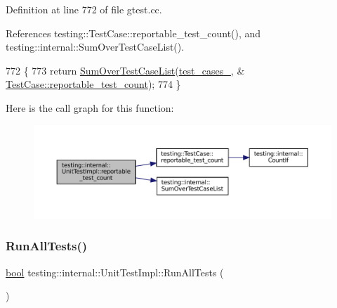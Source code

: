 Definition at line 772 of file gtest.\+cc.



References testing\+::\+Test\+Case\+::reportable\+\_\+test\+\_\+count(), and testing\+::internal\+::\+Sum\+Over\+Test\+Case\+List().


\begin{DoxyCode}
772                                               \{
773   \textcolor{keywordflow}{return} \hyperlink{namespacetesting_1_1internal_a564f9e608c608736ebe2199ab831745b}{SumOverTestCaseList}(\hyperlink{classtesting_1_1internal_1_1UnitTestImpl_a79ec0f733ada2898efd1a7fbd8587fb3}{test\_cases\_}, &
      \hyperlink{classtesting_1_1TestCase_ae4e69f1a77b6aba274981e987e50acab}{TestCase::reportable\_test\_count});
774 \}
\end{DoxyCode}
Here is the call graph for this function\+:
\nopagebreak
\begin{figure}[H]
\begin{center}
\leavevmode
\includegraphics[width=350pt]{classtesting_1_1internal_1_1UnitTestImpl_addb3896c4e0973bb5d2744fcb158afce_cgraph}
\end{center}
\end{figure}
\mbox{\label{classtesting_1_1internal_1_1UnitTestImpl_a1fb6be9971f4768c4136a05aa9e7e375}} 
\subsubsection{\texorpdfstring{Run\+All\+Tests()}{RunAllTests()}}
{\footnotesize\ttfamily \hyperlink{classbool}{bool} testing\+::internal\+::\+Unit\+Test\+Impl\+::\+Run\+All\+Tests (\begin{DoxyParamCaption}{ }\end{DoxyParamCaption})}



